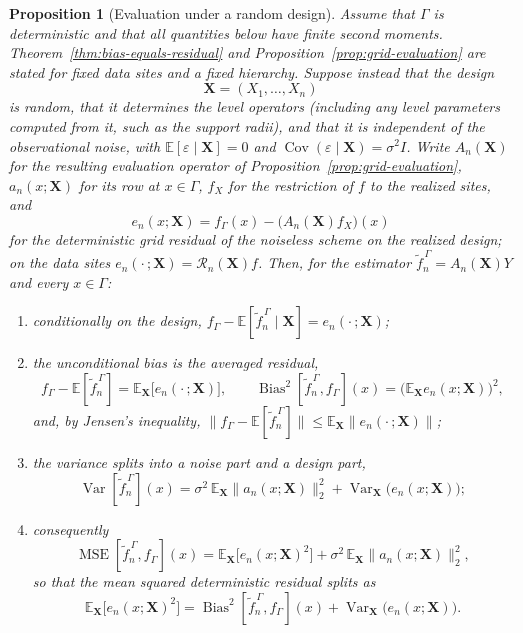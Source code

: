 \documentclass[12pt]{article}
\newtheorem{proposition}[theorem]{Proposition}
\newcommand{\E}{{\mathbb{E}}}
\DeclareMathOperator{\mse}{MSE}
\newcommand{\bias}{\operatorname{Bias}^2}
\DeclareMathOperator{\var}{Var}
\begin{document}
\begin{proposition}[Evaluation under a random design]\label{prop:random-design}
Assume that $\Gamma$ is deterministic and that all quantities
below have finite second moments. Theorem~\ref{thm:bias-equals-residual} and Proposition~\ref{prop:grid-evaluation} are stated for fixed data sites and a fixed hierarchy. Suppose instead that the design
\[
    \mathbf X=(X_1,\ldots,X_n)
\]
is random, that it determines the level operators (including any level parameters computed from it, such as the support radii), and that it is independent of the observational noise, with $\E[\varepsilon\mid\mathbf X]=0$ and $\operatorname{Cov}(\varepsilon\mid\mathbf X)=\sigma^2I$. Write $A_n(\mathbf X)$ for the resulting evaluation operator of Proposition~\ref{prop:grid-evaluation}, $a_n(x;\mathbf X)$ for its row at $x\in\Gamma$, $f_X$ for the restriction of $f$ to the realized sites, and
\[
    e_n(x;\mathbf X)
    =
    f_\Gamma(x)-\bigl(A_n(\mathbf X)f_X\bigr)(x)
\]
for the deterministic grid residual of the noiseless scheme on the realized design; on the data sites $e_n(\cdot\,;\mathbf X)=\mathcal R_n(\mathbf X)f$. Then, for the estimator $\widetilde f_n^{\,\Gamma}=A_n(\mathbf X)Y$ and every $x\in\Gamma$:
\begin{enumerate}[label=(\roman*)]
\item conditionally on the design, $f_\Gamma-\E[\widetilde f_n^{\,\Gamma}\mid\mathbf X]=e_n(\cdot\,;\mathbf X)$;
\item the unconditional bias is the averaged residual,
\[
    f_\Gamma-\E[\widetilde f_n^{\,\Gamma}]=\E_{\mathbf X}\bigl[e_n(\cdot\,;\mathbf X)\bigr],
    \qquad
    \bias[\widetilde f_n^{\,\Gamma},f_\Gamma](x)=\bigl(\E_{\mathbf X}e_n(x;\mathbf X)\bigr)^2 ,
\]
and, by Jensen's inequality, $\|f_\Gamma-\E[\widetilde f_n^{\,\Gamma}]\|\leq\E_{\mathbf X}\|e_n(\cdot\,;\mathbf X)\|$;
\item the variance splits into a noise part and a design part,
\[
    \var[\widetilde f_n^{\,\Gamma}](x)
    =
    \sigma^2\,\E_{\mathbf X}\|a_n(x;\mathbf X)\|_2^2
    +
    \var_{\mathbf X}\bigl(e_n(x;\mathbf X)\bigr);
\]
\item consequently
\[
    \mse[\widetilde f_n^{\,\Gamma},f_\Gamma](x)
    =
    \E_{\mathbf X}\bigl[e_n(x;\mathbf X)^2\bigr]
    +
    \sigma^2\,\E_{\mathbf X}\|a_n(x;\mathbf X)\|_2^2 ,
\]
so that the mean squared deterministic residual splits as
\begin{equation}\label{eq:residual-splits}
    \E_{\mathbf X}\bigl[e_n(x;\mathbf X)^2\bigr]
    =
    \bias[\widetilde f_n^{\,\Gamma},f_\Gamma](x)
    +
    \var_{\mathbf X}\bigl(e_n(x;\mathbf X)\bigr).
\end{equation}
\end{enumerate}
\end{proposition}
\end{document}
